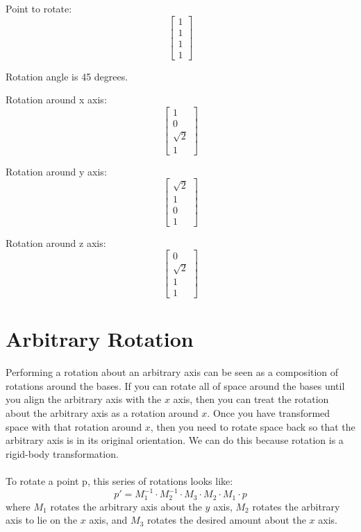\documentclass[10pt,twocolumn]{article}
\begin{document}
\begin{framed}
\vspace{20em}

Point to rotate:
\begin{equation*}
	\begin{bmatrix}
	1 \\
	1 \\
	1 \\
	1 
	\end{bmatrix}
\end{equation*}

Rotation angle is 45 degrees.

Rotation around x axis:
\begin{equation*}
	\begin{bmatrix}
	1 \\
	0 \\
	\sqrt{2} \\
	1 
	\end{bmatrix}
\end{equation*}

Rotation around y axis:
\begin{equation*}
	\begin{bmatrix}
	\sqrt{2} \\
	1 \\
	0 \\
	1 
	\end{bmatrix}
\end{equation*}

Rotation around z axis:
\begin{equation*}
	\begin{bmatrix}
	0 \\
	\sqrt{2} \\
	1 \\
	1 
	\end{bmatrix}
\end{equation*}

\end{framed}

\section{Arbitrary Rotation}
Performing a rotation about an arbitrary axis can be seen as a composition of rotations around the bases. If you can rotate all of space around the bases until you align the arbitrary axis with the $x$ axis, then you can treat the rotation about the arbitrary axis as a rotation around $x$. Once you have transformed space with that rotation around $x$, then you need to rotate space back so that the arbitrary axis is in its original orientation. We can do this because rotation is a rigid-body transformation.\\\\
To rotate a point p, this series of rotations looks like:
\[p' = M^{-1}_1\cdot M^{-1}_2 \cdot M_3 \cdot M_2 \cdot M_1 \cdot p\]
where $M_1$ rotates the arbitrary axis about the $y$ axis, $M_2$ rotates the arbitrary axis to lie on the $x$ axis, and $M_3$ rotates the desired amount about the $x$ axis.
\end{document}

